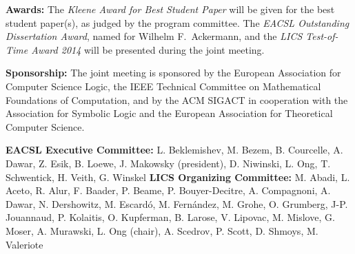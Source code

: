 \documentclass[oneside]{article}
\begin{document}
{\begin{minipage}[t]{\rightcol}
  \noindent%
  \textbf{Awards:} %
  The \emph{Kleene Award for Best Student Paper} will be given for the best
  student paper(s), as judged by the program committee.
  The \emph{EACSL Outstanding Dissertation Award}, named for Wilhelm F.\
  Ackermann,
  and the \emph{LICS Test-of-Time Award 2014}
  will be presented during the joint meeting.

  \medskip

%

  \noindent%
  \textbf{Sponsorship:} %
  The joint meeting is sponsored by the European Association for Computer
  Science Logic, the IEEE Technical Committee on Mathematical Foundations of
  Computation, and by the ACM SIGACT in cooperation with the Association for
  Symbolic Logic and the European Association for Theoretical Computer Science.

\end{minipage}
}

\medskip

 \noindent%
\bgroup \small
  \textbf{EACSL Executive Committee:}
L. Beklemishev, M. Bezem, B. Courcelle, A. Dawar, Z. Esik, B. Loewe,
J. Makowsky (president), D. Niwinski, L. Ong, T. Schwentick, H. Veith,
G. Winskel
%
\quad  \textbf{LICS Organizing Committee:}
M. Abadi, L. Aceto, R. Alur, F. Baader, P. Beame, P. Bouyer-Decitre,
A. Compagnoni, A. Dawar, N. Dershowitz, M. Escardó, M. Fernández,
M. Grohe, O. Grumberg, J-P. Jouannaud, P. Kolaitis, O. Kupferman,
B. Larose, V. Lipovac, M. Mislove, G. Moser, A. Murawski, L. Ong
(chair), A. Scedrov, P. Scott, D. Shmoys, M. Valeriote
\egroup
\end{document}
